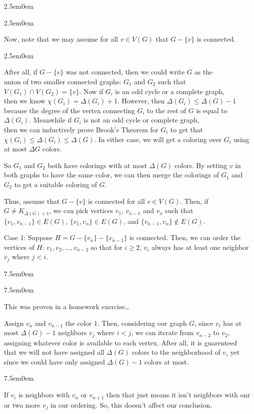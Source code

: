 \documentclass{book}
\newcommand{\hFour}{%
   \color{Cerulean}
   \fontsize{12}{14}\selectfont%
}
\newcommand{\teachComment}{
   \color{Orange}%
   \fontsize{12}{14}\selectfont%
}
\newenvironment{myIndent}{%
   \begin{adjustwidth}{2.5em}{0em}%
}{%
   \end{adjustwidth}%
}
\newenvironment{myTindent}{%
   \begin{adjustwidth}{7.5em}{0em}%
}{%
   \end{adjustwidth}%
}
\newcommand{\uuline}[2][.]{%
{\vphantom{a}\color{#1}%
\rlap{\rule[-0.18em]{\widthof{#2}}{0.06em}}%
\rlap{\rule[-0.32em]{\widthof{#2}}{0.06em}}}%
#2}
\newcommand{\retTwo}{\hfill\bigbreak}
\begin{document}
{\begin{myIndent}
{\begin{myIndent}
      Now, note that we may assume for all $v \in V(G)$ that $G - \{v\}$ is connected. 
      {\begin{myIndent} \hFour
         After all, if $G - \{v\}$ was not connected, then we could write $G$ as the\\ union of two smaller connected graphs: $G_1$ and $G_2$ such that\\ $V(G_1) \cap V(G_2) = \{v\}$. Now if $G_i$ is an odd cycle or a complete graph,\\ then we know $\chi(G_i) = \Delta(G_i) + 1$. However, then $\Delta(G_i) \leq \Delta(G) - 1$ because the degree of the vertex connecting $G_i$ to the rest of $G$ is equal to $\Delta(G_i)$. Meanwhile if $G_i$ is not an odd cycle or complete graph,\\ then we can inductively prove Brook's Theorem for $G_i$ to get that\\ $\chi(G_i) \leq \Delta(G_i) \leq \Delta(G)$. In either case, we will get a coloring over $G_i$ using at most $\Delta G$ colors. \retTwo

         So $G_1$ and $G_2$ both have colorings with at most $\Delta(G)$ colors. By setting $v$ in both graphs to have the same color, we  can then merge the colorings of $G_1$ and $G_2$ to get a suitable coloring of $G$.
         \retTwo
      \end{myIndent}}

      Thus, assume that $G - \{v\}$ is connected for all $v \in V(G)$. Then, if\\ $G \neq K_{\Delta(G) + 1}$, we can pick vertices $v_1$, $v_{n-1}$ and $v_{n}$ such that\\ $\{v_1, v_{n-1}\} \in E(G)$, $\{v_1, v_{n}\} \in E(G)$, and $\{v_{n-1}, v_{n}\} \notin E(G)$. \retTwo

      \uuline{Case 1}: Suppose $H = G - \{v_n\} - \{v_{n-1}\}$ is connected. Then, we can order the vertices of $H$: $v_1, v_2, \ldots, v_{n-2}$ so that for $i \geq 2$, $v_i$ always has at least one neighbor $v_j$ where $j < i$.
      {\begin{myTindent}\begin{myTindent} \teachComment
         This was proven in a homework exercise\dots\retTwo
      \end{myTindent}\end{myTindent}}

      Assign $v_n$ and $v_{n-1}$ the color $1$. Then, considering our graph $G$, since $v_i$ has at most $\Delta(G) - 1$ neighbors $v_j$ where $i < j$, we can iterate from $v_{n-2}$ to $v_2$, assigning whatever color is available to each vertex. After all, it is guarenteed that we will not have assigned all $\Delta(G)$ colors to the neighborhood of $v_i$ yet since we could have only assigned $\Delta(G) - 1$ colors at most.
      {\begin{myTindent} \hFour
         If $v_i$ is neighbors with $v_n$ or $v_{n+1}$ then that just means it isn't neighbors with onr or two more $v_j$ in our ordering. So, this doesn't affect our conclusion. \retTwo
      \end{myTindent}}


\end{myIndent}}
\end{myIndent}}
\end{document}
